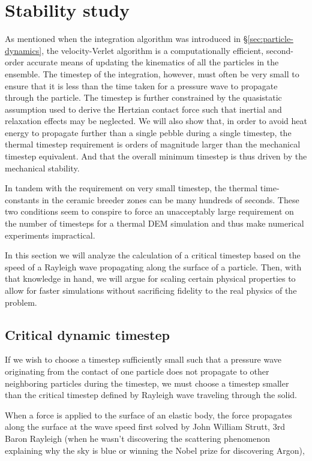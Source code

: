 \section{Stability study}\label{sec:dem-stability}
As mentioned when the integration algorithm was introduced in \S\ref{sec:particle-dynamics}, the velocity-Verlet algorithm is a computationally efficient, second-order accurate means of updating the kinematics of all the particles in the ensemble\cite{Kruggel-Emden2008}. The timestep of the integration, however, must often be very small to ensure that it is less than the time taken for a pressure wave to propagate through the particle. The timestep is further constrained by the quasistatic assumption used to derive the Hertzian contact force such that inertial and relaxation effects may be neglected\cite{Brilliantov1996}. We will also show that, in order to avoid heat energy to propagate further than a single pebble during a single timestep, the thermal timestep requirement is orders of magnitude larger than the mechanical timestep equivalent. And that the overall minimum timestep is thus driven by the mechanical stability.

In tandem with the requirement on very small timestep, the thermal time-constants in the ceramic breeder zones can be many hundreds of seconds. These two conditions seem to conspire to force an unacceptably large requirement on the number of timesteps for a thermal DEM simulation and thus make numerical experiments impractical.

In this section we will analyze the calculation of a critical timestep based on the speed of a Rayleigh wave propagating along the surface of a particle. Then, with that knowledge in hand, we will argue for scaling certain physical properties to allow for faster simulations without sacrificing fidelity to the real physics of the problem.


\subsection{Critical dynamic timestep}
If we wish to choose a timestep sufficiently small such that a pressure wave originating from the contact of one particle does not propagate to other neighboring particles during the timestep, we must choose a timestep smaller than the critical timestep defined by Rayleigh wave traveling through the solid.

When a force is applied to the surface of an elastic body, the force propagates along the surface at the wave speed first solved by John William Strutt, 3rd Baron Rayleigh\cite{Rayleigh1885} (when he wasn't discovering the scattering phenomenon explaining why the sky is blue or winning the Nobel prize for discovering Argon),

